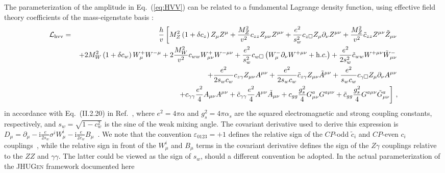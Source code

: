 \documentclass[aps,superscriptaddress,nofootinbib]{revtex4}
\begin{document}
The parameterization of the amplitude in Eq.~(\ref{eq:HVV}) can be related to a fundamental Lagrange density function,
using effective field theory coefficients of the mass-eigenstate basis \cite{deFlorian:2016spz}:
\begin{eqnarray}
\label{eq:EFT_hvv}
 {\cal L}_{\rm hvv} =& & {h \over v} \left [ 
  M_Z^2 \left (1 +  \delta c_z \right )   Z_\mu Z^\mu
+ \frac{M_Z^2}{v^2} c_{zz} Z_{\mu \nu} Z^{\mu\nu}  
+ \frac{e^2}{s_w^2} c_{z \Box} Z_\mu \partial_\nu Z^{\mu \nu}
+ \frac{M_Z^2}{v^2} \tilde c_{zz}  Z^{\mu \nu} \tilde Z_{\mu\nu}
\right . \nonumber \\ & & \left . 
% 
% 
 +2 M_W^2 \left (1 +  \delta c_w \right ) W_\mu^+ W^{-\mu} 
+ 2 \frac{M_W^2}{v^2} c_{ww}  W_{\mu \nu}^+  W^{-\mu\nu} 
+ \frac{e^2}{s_w^2} c_{w \Box} \left (W_\mu^- \partial_\nu W^{+\mu \nu} + {\mathrm h.c.} \right )  
 + \frac{e^2}{2 s_w^2} \tilde c_{ww}  W^{+\mu \nu}   \tilde W_{\mu\nu}^- 
 \right . \nonumber \\ & & \left . 
% 
% 
+ \frac{e^2}{2 s_w c_w} c_{z \gamma}  Z_{\mu \nu} A^{\mu\nu} 
+ \frac{e^2}{2 s_w c_w} \tilde c_{z \gamma} Z_{\mu \nu} \tilde A^{\mu\nu}
+ \frac{e^2}{s_w c_w} c_{\gamma \Box}  Z_\mu \partial_\nu A^{\mu \nu}
\right . \nonumber \\ & & \left . 
% 
% 
+ c_{\gamma \gamma} {e^2 \over 4} A_{\mu \nu} A^{\mu \nu} 
+ \tilde c_{\gamma \gamma} {e^2 \over 4} A^{\mu \nu} \tilde A_{\mu \nu} 
+  c_{gg} {g_s^2 \over 4 } G_{\mu \nu}^a G^{a \mu \nu}   
+  \tilde c_{gg} {g_s^2 \over 4} G^{a\mu \nu} \tilde G_{\mu \nu}^a  
\right ]\,,
\end{eqnarray} 
in accordance with Eq.~(II.2.20) in Ref.~\cite{deFlorian:2016spz}, where $e^2=4\pi \alpha$ and $g_s^2= 4\pi \alpha_s$ are the squared electromagnetic and strong coupling constants, 
respectively, and $s_w=\sqrt{1-c_w^2}$ is the sine of the weak mixing angle. 
The covariant derivative used to derive this expression is 
$D_\mu = \partial_\mu -\mathrm{i} \frac{e}{2 s_w} \sigma^i W_\mu^i - \mathrm{i} \frac{e}{2 c_w} B_\mu$~\cite{deFlorian:2016spz, Falkowski:2001958}.  
We note that the convention $\varepsilon_{0123}=+1$ defines the relative sign of the $CP$-odd $\tilde{c}_i$ and 
$CP$-even ${c}_i$ couplings~\cite{Gritsan:2020pib}, while the relative sign in front of the $W_\mu^i$ and $B_\mu$ terms 
in the covariant derivative defines the sign of the $Z\gamma$ couplings relative to the $ZZ$ and $\gamma\gamma$. 
The latter could be viewed as the sign of $s_w$, should a different convention be adopted.
In the actual parameterization of the \textsc{JHUGen} framework documented here
\end{document}
